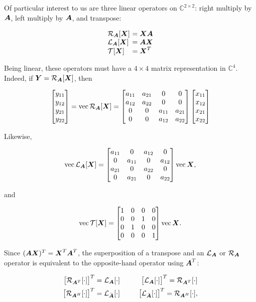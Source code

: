 \documentclass[useAMS,usenatbib]{mn2e}
\newcommand{\COMPLEX}{\mathbb{C}}
\newcommand{\mat}[1]{{\bmath{#1}}}
\begin{document}
Of particular interest to us are three linear operators on $\COMPLEX^{2\times2}$: right multiply by $\mat{A}$, left multiply by $\mat{A}$, and
transpose: 

\[
\begin{array}{l@{~}l}
\Rop{\mat{A}}[\mat{X}] &= \mat{XA} \\
\Lop{\mat{A}}[\mat{X}] &= \mat{AX} \\
\Top[\mat{X}] &= \mat{X}^T
\end{array}
\]

Being linear, these operators must have a $4\times4$ matrix representation in $\COMPLEX^4$. 
Indeed, if $\mat{Y}=\Rop{\mat{A}}[\mat{X}]$, then 

\begin{equation}
\Matrix{c}{y_{11}\\y_{12}\\y_{21}\\y_{22}} = \VEC{\Rop{\mat{A}}[\mat{X}]} = 
\Matrix{cccc}{a_{11}&a_{21}&0&0 \\ a_{12}&a_{22}&0&0 \\ 0&0&a_{11}&a_{21} \\ 0&0&a_{12}&a_{22} }
\Matrix{c}{x_{11}\\x_{12}\\x_{21}\\x_{22}} 
\end{equation}

Likewise, 

\begin{equation}
\VEC{\Lop{\mat{A}}[\mat{X}]} = 
\Matrix{cccc}{a_{11}&0&a_{12}&0 \\ 0&a_{11}&0&a_{12} \\ a_{21}&0&a_{22}&0  \\ 0&a_{21}&0&a_{22} }
\VEC{\mat{X}},
\end{equation}

and

\begin{equation}
\VEC{\Top[\mat{X}]} = 
\Matrix{cccc}{1&0&0&0 \\ 0&0&1&0 \\ 0&1&0&0 \\ 0&0&0&1} \VEC{\mat{X}}.
\end{equation}

Since $(\mat{A}\mat{X})^T = \mat{X}^T \mat{A}^T$, the superposition of a transpose and
an $\Lop{\mat{A}}$ or $\Rop{\mat{A}}$ operator is equivalent to the opposite-hand operator using $\mat{A}^T$:

\begin{eqnarray}
\label{eq:LA:RATT}
\big[ \Rop{\mat{A}^T}[\cdot] \big ]^T = \Lop{\mat{A}}[\cdot] ~~&~&~~
\big[ \Lop{\mat{A}}[\cdot] \big]^T = \Rop{\mat{A}^T}[\cdot] \nonumber\\
\big[ \Rop{\mat{A}^H}[\cdot] \big ]^T = \Lop{\bar{\mat{A}}}[\cdot] ~~&~&~~
\big[ \Lop{\bar{\mat{A}}}[\cdot] \big]^T = \Rop{\mat{A}^H}[\cdot],
\end{eqnarray}
\end{document}
